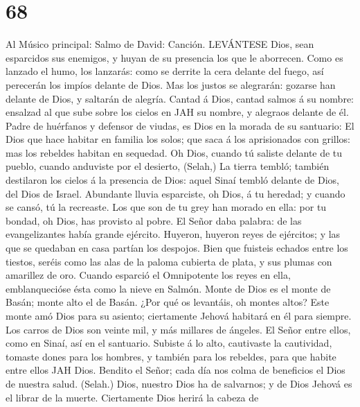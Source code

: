 \hypertarget{section-67}{%
\section{68}\label{section-67}}

 Al Músico principal: Salmo de David: Canción. LEVÁNTESE
Dios, sean esparcidos sus enemigos, y huyan de su presencia los que le
aborrecen.  Como es lanzado el humo, los lanzarás: como se
derrite la cera delante del fuego, así perecerán los impíos delante de
Dios.  Mas los justos se alegrarán: gozarse han delante de
Dios, y saltarán de alegría.  Cantad á Dios, cantad salmos á
su nombre: ensalzad al que sube sobre los cielos en JAH su nombre, y
alegraos delante de él.  Padre de huérfanos y defensor de
viudas, es Dios en la morada de su santuario:  El Dios que
hace habitar en familia los solos; que saca á los aprisionados con
grillos: mas los rebeldes habitan en sequedad.  Oh Dios,
cuando tú saliste delante de tu pueblo, cuando anduviste por el
desierto, (Selah,)  La tierra tembló; también destilaron los
cielos á la presencia de Dios: aquel Sinaí tembló delante de Dios, del
Dios de Israel.  Abundante lluvia esparciste, oh Dios, á tu
heredad; y cuando se cansó, tú la recreaste.  Los que son
de tu grey han morado en ella: por tu bondad, oh Dios, has provisto al
pobre.  El Señor daba palabra: de las evangelizantes había
grande ejército.  Huyeron, huyeron reyes de ejércitos; y
las que se quedaban en casa partían los despojos.  Bien que
fuisteis echados entre los tiestos, seréis como las alas de la paloma
cubierta de plata, y sus plumas con amarillez de oro. 
Cuando esparció el Omnipotente los reyes en ella, emblanquecióse ésta
como la nieve en Salmón.  Monte de Dios es el monte de
Basán; monte alto el de Basán.  ¿Por qué os levantáis, oh
montes altos? Este monte amó Dios para su asiento; ciertamente Jehová
habitará en él para siempre.  Los carros de Dios son veinte
mil, y más millares de ángeles. El Señor entre ellos, como en Sinaí, así
en el santuario.  Subiste á lo alto, cautivaste la
cautividad, tomaste dones para los hombres, y también para los rebeldes,
para que habite entre ellos JAH Dios.  Bendito el Señor;
cada día nos colma de beneficios el Dios de nuestra salud. (Selah.)
 Dios, nuestro Dios ha de salvarnos; y de Dios Jehová es el
librar de la muerte.  Ciertamente Dios herirá la cabeza de
